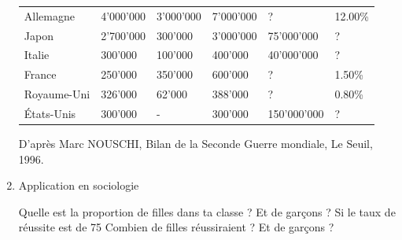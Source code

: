 \begin{exercice}
\begin{enumerate}
\begin{tabular}{llllll}
Allemagne   & 4'000'000                                                     & 3'000'000                                                  & 7'000'000                                                  & ?                                                                            & 12.00\%                                                      \\
Japon       & 2'700'000                                                     & 300'000                                                    & 3'000'000                                                  & 75'000'000                                                                   & ?                                                            \\
Italie      & 300'000                                                       & 100'000                                                    & 400'000                                                    & 40'000'000                                                                   & ?                                                            \\
France      & 250'000                                                       & 350'000                                                    & 600'000                                                    & ?                                                                            & 1.50\%                                                       \\
Royaume-Uni & 326'000                                                       & 62'000                                                     & 388'000                                                    & ?                                                                            & 0.80\%                                                       \\
États-Unis  & 300'000                                                       & -                                                          & 300'000                                                    & 150'000'000                                                                  & ?                                                           
\end{tabular}
D'après Marc NOUSCHI, Bilan de la Seconde Guerre mondiale, Le Seuil, 1996.

\item Application en sociologie

Quelle est la proportion de filles dans ta classe ? Et de garçons ?
Si le taux de réussite est de 75 %
Combien de filles réussiraient ? Et de garçons ?
 

\end{enumerate}
\end{exercice}
